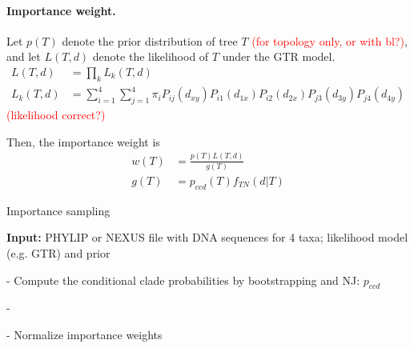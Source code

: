 \documentclass[12pt,letterpaper]{article}
\newcommand{\falta}[1]{\textcolor{red}{#1}}
\begin{document}
\paragraph{Importance weight.} Let $p(T)$ denote the prior
distribution of tree $T$ \falta{(for topology only, or with bl?)}, and
let $L(T,d)$ denote the likelihood of $T$ under the GTR model.
\begin{align*}
L(T,d) &= \prod_k L_k(T,d) \\
L_k(T,d) & = \sum_{i=1}^4 \sum_{j=1}^4 \pi_i P_{ij}(d_{xy}) P_{i1}(d_{1x}) P_{i2}(d_{2x}) P_{j3}(d_{3y}) P_{j4}(d_{4y})
\end{align*}
\falta{(likelihood correct?)}

Then, the importance weight is
\begin{align*}
w(T) &= \frac{p(T)L(T,d)}{g(T)} \\
g(T) &= p_{ccd}(T) f_{TN}(d | T)
\end{align*}


\begin{algorithm}
\caption{Importance sampling}
\label{someAlg}

\textbf{Input:} PHYLIP or NEXUS file with DNA sequences for 4 taxa;
likelihood model (e.g. GTR) and prior

- Compute the conditional clade probabilities by bootstrapping and NJ: $p_{ccd}$

- 

- Normalize importance weights







\end{algorithm}
\end{document}
